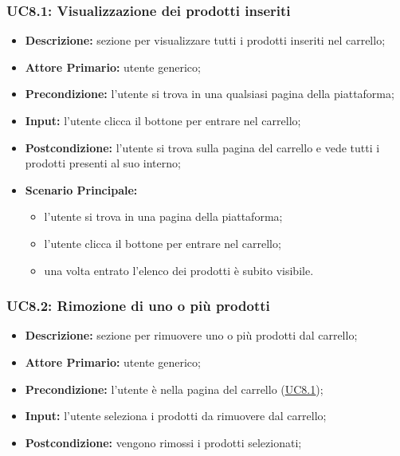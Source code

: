         \subsubsection{UC8.1: Visualizzazione dei prodotti inseriti}
        \label{sec:UC8.1}
        \begin{itemize}
            \item \textbf{Descrizione:} sezione per visualizzare tutti i prodotti inseriti nel carrello;
            \item \textbf{Attore Primario:} utente generico;
            \item \textbf{Precondizione:}  l'utente si trova in una qualsiasi pagina della piattaforma;
            \item \textbf{Input:} l'utente clicca il bottone per entrare nel carrello;
            \item \textbf{Postcondizione:} l'utente si trova sulla pagina del carrello e vede tutti i prodotti presenti al suo interno;
            \item \textbf{Scenario Principale:}
                \begin{itemize}
                    \item l'utente si trova in una pagina della piattaforma;
                    \item l'utente clicca il bottone per entrare nel carrello;
                    \item una volta entrato l'elenco dei prodotti è subito visibile.
                \end{itemize}
        \end{itemize}
        \subsubsection{UC8.2: Rimozione di uno o più prodotti}
        \begin{itemize}
            \item \textbf{Descrizione:} sezione per rimuovere uno o più prodotti dal carrello;
            \item \textbf{Attore Primario:} utente generico;
            \item \textbf{Precondizione:} l'utente è nella pagina del carrello (\hyperref[sec:UC8.1]{\underline{UC8.1}});
            \item \textbf{Input:} l'utente seleziona i prodotti da rimuovere dal carrello;
            \item \textbf{Postcondizione:} vengono rimossi i prodotti selezionati;
        \end{itemize}
